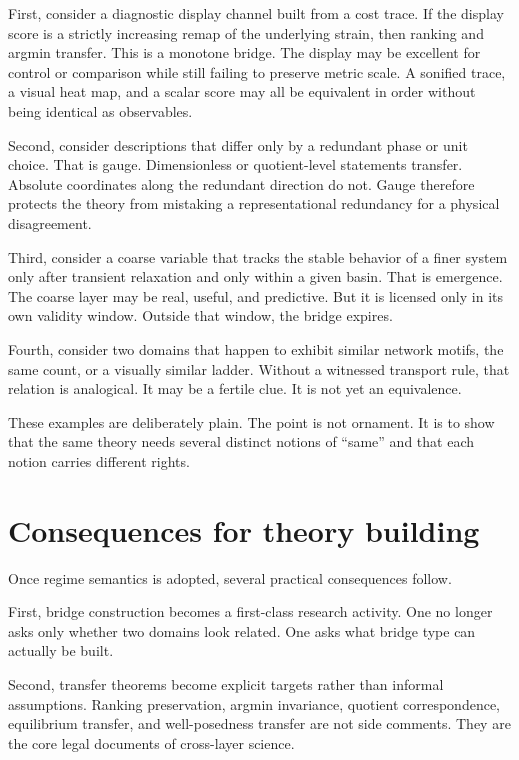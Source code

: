 \documentclass[11pt]{article}
\begin{document}
First, consider a diagnostic display channel built from a cost trace. If the display score is a strictly increasing remap of the underlying strain, then ranking and argmin transfer. This is a monotone bridge. The display may be excellent for control or comparison while still failing to preserve metric scale. A sonified trace, a visual heat map, and a scalar score may all be equivalent in order without being identical as observables.

Second, consider descriptions that differ only by a redundant phase or unit choice. That is gauge. Dimensionless or quotient-level statements transfer. Absolute coordinates along the redundant direction do not. Gauge therefore protects the theory from mistaking a representational redundancy for a physical disagreement.

Third, consider a coarse variable that tracks the stable behavior of a finer system only after transient relaxation and only within a given basin. That is emergence. The coarse layer may be real, useful, and predictive. But it is licensed only in its own validity window. Outside that window, the bridge expires.

Fourth, consider two domains that happen to exhibit similar network motifs, the same count, or a visually similar ladder. Without a witnessed transport rule, that relation is analogical. It may be a fertile clue. It is not yet an equivalence.

These examples are deliberately plain. The point is not ornament. It is to show that the same theory needs several distinct notions of ``same'' and that each notion carries different rights.

\section{Consequences for theory building}

Once regime semantics is adopted, several practical consequences follow.

First, bridge construction becomes a first-class research activity. One no longer asks only whether two domains look related. One asks what bridge type can actually be built.

Second, transfer theorems become explicit targets rather than informal assumptions. Ranking preservation, argmin invariance, quotient correspondence, equilibrium transfer, and well-posedness transfer are not side comments. They are the core legal documents of cross-layer science.
\end{document}
